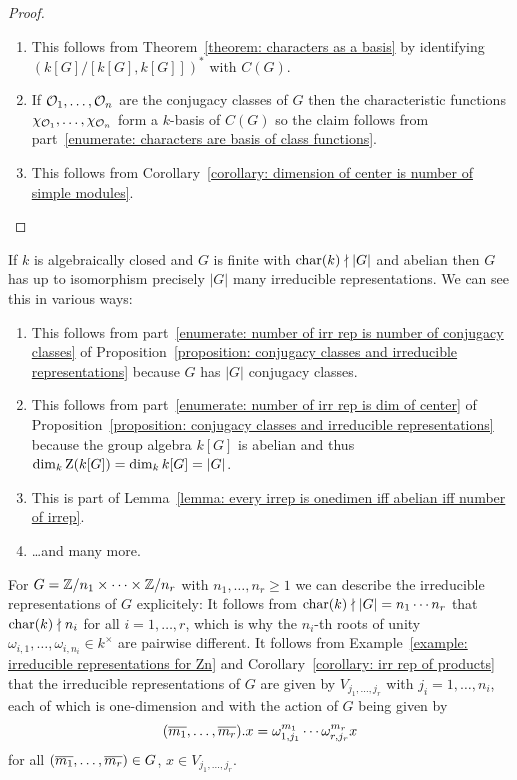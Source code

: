 \begin{proof}
  \leavevmode
  \begin{enumerate}
    \item
      This follows from Theorem~\ref{theorem: characters as a basis} by identifying $(k[G]/[k[G], k[G]])^*$ with $C(G)$.
    \item
      If $\mathcal{O}_1, \dotsc, \mathcal{O}_n$ are the conjugacy classes of $G$ then the characteristic functions $\chi_{\mathcal{O}_1}, \dotsc, \chi_{\mathcal{O}_n}$ form a $k$-basis of $C(G)$ so the claim follows from part~\ref*{enumerate: characters are basis of class functions}.
    \item
      This follows from Corollary~\ref{corollary: dimension of center is number of simple modules}.
    \qedhere
  \end{enumerate}
\end{proof}




\begin{example}
  \label{example: irrep of finite abelian groups}
  If $k$ is algebraically closed and $G$ is finite with $\operatorname{char}(k) \nmid |G|$ and abelian then $G$ has up to isomorphism precisely $|G|$ many irreducible representations.
  We can see this in various ways:
  \begin{enumerate}
    \item
      This follows from part~\ref*{enumerate: number of irr rep is number of conjugacy classes} of Proposition~\ref*{proposition: conjugacy classes and irreducible representations} because $G$ has $|G|$ conjugacy classes.
    \item
      This follows from part~\ref*{enumerate: number of irr rep is dim of center} of Proposition~\ref*{proposition: conjugacy classes and irreducible representations} because the group algebra $k[G]$ is abelian and thus $\dim_k \operatorname{Z}(k[G]) = \dim_k k[G] = |G|$.
    \item
      This is part of Lemma~\ref*{lemma: every irrep is onedimen iff abelian iff number of irrep}.
    \item
      \dots and many more.
  \end{enumerate}
  For $G = \mathbb{Z}/n_1 \times \dotsb \times \mathbb{Z}/n_r$ with $n_1, \dotsc, n_r \geq 1$ we can describe the irreducible representations of $G$ explicitely:
  It follows from $\operatorname{char}(k) \nmid |G| = n_1 \dotsm n_r$ that $\operatorname{char}(k) \nmid n_i$ for all $i = 1, \dotsc, r$, which is why the $n_i$-th roots of unity $\omega_{i,1}, \dotsc, \omega_{i,n_i} \in k^\times$ are pairwise different.
  It follows from Example~\ref{example: irreducible representations for Zn} and Corollary~\ref{corollary: irr rep of products} that the irreducible representations of $G$ are given by $V_{j_1, \dotsc, j_r}$ with $j_i = 1, \dotsc, n_i$, each of which is one-dimension and with the action of $G$ being given by
  \[
      (\overline{m_1}, \dotsc, \overline{m_r}) . x
    = \omega_{1,j_1}^{m_1} \dotsm \omega_{r,j_r}^{m_r} x
  \]
  for all $(\overline{m_1}, \dotsc, \overline{m_r}) \in G$, $x \in V_{j_1, \dotsc, j_r}$.
\end{example}


